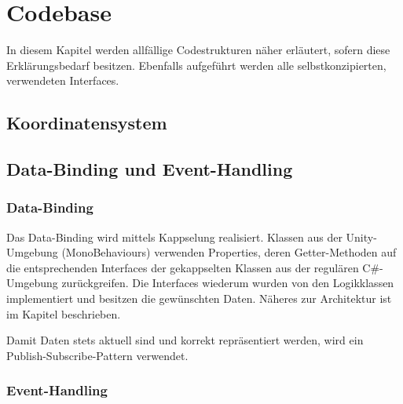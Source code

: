\documentclass[../main.tex]{subfiles}
\begin{document}

	\section{Codebase}
	\par In diesem Kapitel werden allfällige Codestrukturen näher erläutert, sofern diese Erklärungsbedarf besitzen. Ebenfalls aufgeführt werden alle selbstkonzipierten, verwendeten Interfaces.
	\subsection{Koordinatensystem}
	\subsection{Data-Binding und Event-Handling}
	\subsubsection{Data-Binding}
	\par Das Data-Binding wird mittels Kappselung realisiert. Klassen aus der Unity-Umgebung (MonoBehaviours) verwenden Properties, deren Getter-Methoden auf die entsprechenden Interfaces der gekappselten Klassen aus der regulären C\#-Umgebung zurückgreifen. Die Interfaces wiederum wurden von den Logikklassen implementiert und besitzen die gewünschten Daten. Näheres zur Architektur ist im Kapitel  beschrieben.
	\par Damit Daten stets aktuell sind und korrekt repräsentiert werden, wird ein Publish-Subscribe-Pattern verwendet.
	\subsubsection{Event-Handling}
	
\end{document}
